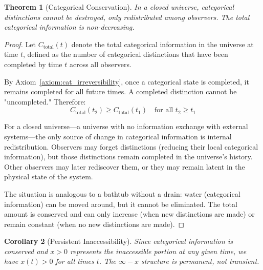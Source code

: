 \documentclass[12pt,a4paper]{article}
\newtheorem{theorem}{Theorem}[section]
\newtheorem{corollary}[theorem]{Corollary}
\theoremstyle{definition}
\theoremstyle{remark}
\begin{document}
\begin{theorem}[Categorical Conservation]
\label{thm:conservation}
In a closed universe, categorical distinctions cannot be destroyed, only redistributed among observers. The total categorical information is non-decreasing.
\end{theorem}

\begin{proof}
Let $C_{\text{total}}(t)$ denote the total categorical information in the universe at time $t$, defined as the number of categorical distinctions that have been completed by time $t$ across all observers.

By Axiom~\ref{axiom:cat_irreversibility}, once a categorical state is completed, it remains completed for all future times. A completed distinction cannot be "uncompleted." Therefore:
\begin{equation}
C_{\text{total}}(t_2) \geq C_{\text{total}}(t_1) \quad \text{for all } t_2 \geq t_1
\end{equation}

For a closed universe—a universe with no information exchange with external systems—the only source of change in categorical information is internal redistribution. Observers may forget distinctions (reducing their local categorical information), but those distinctions remain completed in the universe's history. Other observers may later rediscover them, or they may remain latent in the physical state of the system.

The situation is analogous to a bathtub without a drain: water (categorical information) can be moved around, but it cannot be eliminated. The total amount is conserved and can only increase (when new distinctions are made) or remain constant (when no new distinctions are made).
\end{proof}

\begin{corollary}[Persistent Inaccessibility]
\label{cor:persistent_x}
Since categorical information is conserved and $x > 0$ represents the inaccessible portion at any given time, we have $x(t) > 0$ for all times $t$. The $\infty - x$ structure is permanent, not transient.
\end{corollary}
\end{document}

